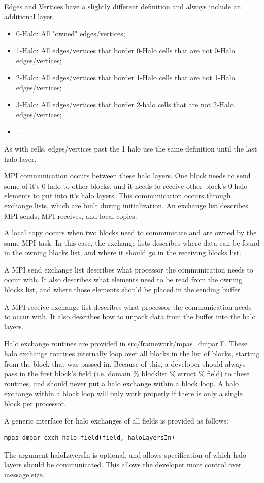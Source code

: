 \documentclass[11pt]{report}
\begin{document}
Edges and Vertices have a slightly different definition and always include an additional layer.
\begin{itemize}
	\item 0-Halo: All "owned" edges/vertices;
	\item 1-Halo: All edges/vertices that border 0-Halo cells that are not 0-Halo edges/vertices;
	\item 2-Halo: All edges/vertices that border 1-Halo cells that are not 1-Halo edges/vertices;
	\item 3-Halo: All edges/vertices that border 2-halo cells that are not 2-Halo edges/vertices;
	\item ...
\end{itemize}
As with cells, edges/vertices past the 1 halo use the same definition until the last halo layer.

MPI communication occurs between these halo layers. One block needs to send
some of it's 0-halo to other blocks, and it needs to receive other block's
0-halo elements to put into it's halo layers. This communication occurs through
exchange lists, which are built during initialization. An exchange list
describes MPI sends, MPI receives, and local copies. 

A local copy occurs when two blocks need to communicate and are owned by the
same MPI task. In this case, the exchange lists describes where data can be
found in the owning blocks list, and where it should go in the receiving blocks
list.

A MPI send exchange list describes what processor the communication needs to
occur with. It also describes what elements need to be read from the owning
blocks list, and where those elements should be placed in the sending buffer.

A MPI receive exchange list describes what processor the communication needs to
occur with. It also describes how to unpack data from the buffer into the halo
layers.

Halo exchange routines are provided in src/framework/mpas\_dmpar.F. These halo
exchange routines internally loop over all blocks in the list of blocks,
starting from the block that was passed in. Because of this, a developer should
always pass in the first block's field (i.e. domain \% blocklist \% struct \%
field) to these routines, and should never put a halo exchange within a block
loop. A halo exchange within a block loop will only work properly if there is
only a single block per processor.

A generic interface for halo exchanges of all fields is provided as follows:
\begin{lstlisting}
mpas_dmpar_exch_halo_field(field, haloLayersIn)
\end{lstlisting}
The argument haloLayersIn is optional, and allows specification of which halo
layers should be communicated. This allows the developer more control over
message size.
\end{document}
